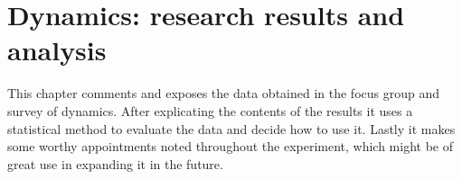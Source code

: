 \chapter{Dynamics: research results and analysis}

This chapter comments and exposes the data obtained in the focus group and survey of dynamics. After explicating the contents of the results it uses a statistical method to evaluate the data and decide how to use it. Lastly it makes some worthy appointments noted throughout the experiment, which might be of great use in expanding it in the future.




